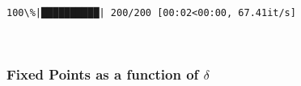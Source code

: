 \documentclass[11pt]{article}
\begin{document}
    \begin{Verbatim}[commandchars=\\\{\}]
100\%|██████████| 200/200 [00:02<00:00, 67.41it/s]
    \end{Verbatim}

    \begin{center}
    \end{center}
    { \hspace*{\fill} \\}
    
    \hypertarget{fixed-points-as-a-function-of-delta}{%
\subsubsection{\texorpdfstring{Fixed Points as a function of
\(\delta\)}{Fixed Points as a function of \textbackslash{}delta}}\label{fixed-points-as-a-function-of-delta}}
\end{document}
